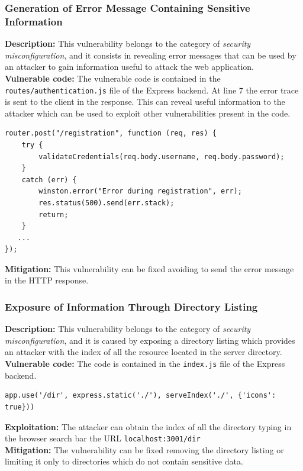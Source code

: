 \documentclass[]{article}
\begin{document}
\subsubsection{Generation of Error Message Containing Sensitive Information}
\textbf{Description:} This vulnerability belongs to the category of {\it security misconfiguration}, and it consists in revealing error messages that can be used by an 
attacker to gain information useful to attack the web application. 
\\
\textbf{Vulnerable code:} The vulnerable code is contained in the \texttt{routes/authentication.js} file of the Express backend. At line 7 the error trace is sent to 
the client in the response. This can reveal useful information to the attacker which can be used to exploit other vulnerabilities present in the code. 
\begin{lstlisting}
router.post("/registration", function (req, res) {
    try {
        validateCredentials(req.body.username, req.body.password);
    }
    catch (err) {
        winston.error("Error during registration", err);
        res.status(500).send(err.stack);
        return;
    }
   ...
});
\end{lstlisting}
\textbf{Mitigation:} This vulnerability can be fixed avoiding to send the error message in the HTTP response.

\subsubsection{Exposure of Information Through Directory Listing}
\label{subsubsec:exposure_of_information_through_directory_listing}
\textbf{Description:} This vulnerability belongs to the category of \textit{security misconfiguration}, and it is caused by exposing a directory listing which
provides an attacker with the index of all the resource located in the server directory.
\\
\textbf{Vulnerable code:} The code is contained in the \texttt{index.js} file of the Express backend. 
\begin{lstlisting}
app.use('/dir', express.static('./'), serveIndex('./', {'icons': true}))
\end{lstlisting}
\textbf{Exploitation:} The attacker can obtain the index of all the directory typing in the browser search bar the URL \texttt{localhost:3001/dir}
\\ 
\textbf{Mitigation:} The vulnerability can be fixed removing the directory listing or limiting it only to directories which do not contain sensitive data.
\end{document}
